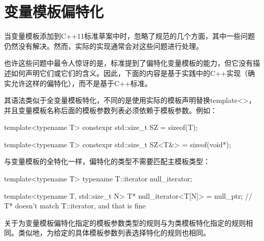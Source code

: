 \section{变量模板偏特化}
当变量模板添加到C++11标准草案中时，忽略了规范的几个方面，其中一些问题仍然没有解决。然而，实际的实现通常会对这些问题进行处理。

也许这些问题中最令人惊讶的是，标准提到了偏特化变量模板的能力，但它没有描述如何声明它们或它们的含义。因此，下面的内容是基于实践中的C++实现（确实允许这样的偏特化），而不是基于C++标准。

其语法类似于全变量模板特化，不同的是使用实际的模板声明替换template<>，并且变量模板名称后面的模板参数列表必须依赖于模板参数。例如：

\begin{cpp}
template<typename T> constexpr std::size_t SZ = sizeof(T);

template<typename T> constexpr std::size_t SZ<T&> = sizeof(void*);
\end{cpp}

与变量模板的全特化一样，偏特化的类型不需要匹配主模板类型：

\begin{cpp}
template<typename T> typename T::iterator null_iterator;

template<typename T, std::size_t N> T* null_iterator<T[N]> = null_ptr;
// T* doesn't match T::iterator, and that is fine
\end{cpp}

关于为变量模板偏特化指定的模板参数类型的规则与为类模板特化指定的规则相同。类似地，为给定的具体模板参数列表选择特化的规则也相同。




































